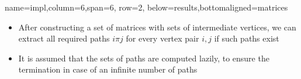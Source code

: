 \documentclass[a0paper,landscape]{baposter}
\begin{document}
\begin{poster}


{name=impl,column=6,span=6, row=2, below=results,bottomaligned=matrices}
{
\begin{itemize}
	\item After constructing a set of matrices with sets of intermediate vertices, we can extract all required paths $i\pi j$ for every vertex pair $i, j$ if such paths exist
	\item It is	assumed that the sets of paths are computed lazily, to ensure the	termination in case of an infinite number of paths
	
\end{itemize}
}


\end{poster}
\end{document}
